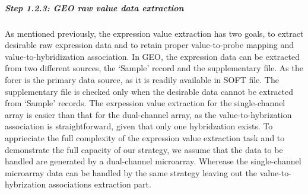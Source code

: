 







\subparagraph{Step 1.2.3: GEO raw value data extraction}


As mentioned previously, the expression value extraction has two goals, to
extract desirable raw expression data and to retain proper value-to-probe
mapping and value-to-hybridization association.
%
In GEO, the expression data can be extracted from two different sources, the
`Sample' record and the supplementary file.
%
As the forer is the primary data source, as it is readily available in SOFT
file.  The supplementary file is checked only when the desirable data cannot
be extracted from `Sample' records.
%
The exrpession value extraction for the single-channel array is easier than
that for the dual-channel array, as the value-to-hybrization association is
straightforward, given that only one hybridzation exists.
%
To apprieciate the full complexity of the expression value extraction task
and to demonstrate the full capacity of our strategy, we assume that the data
to be handled are generated by a dual-channel microarray.  
%
Wherease the single-channel microarray data can be handled by the same
strategy leaving out the value-to-hybrization associations extraction part.





